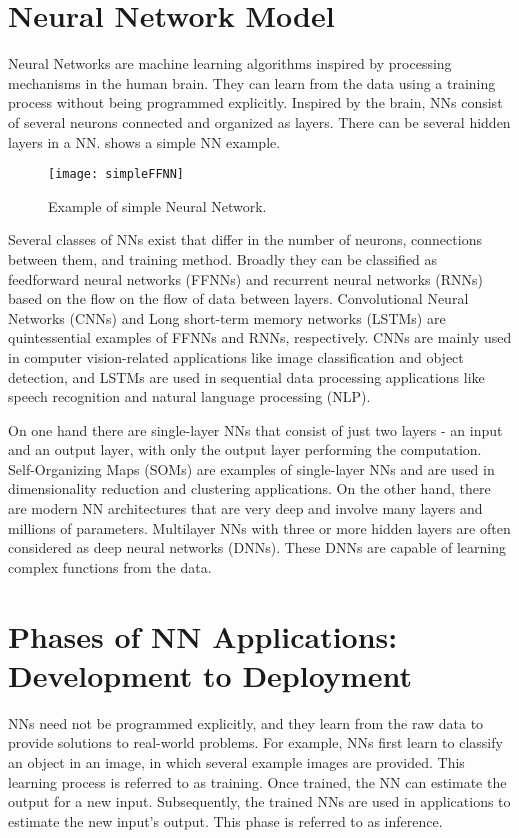 \section{Neural Network Model}
Neural Networks are machine learning algorithms inspired by processing mechanisms in the human brain. They can learn from the data using a training process without being programmed explicitly. Inspired by the brain, NNs consist of several neurons connected and organized as layers. There can be several hidden layers in a NN.  shows a simple NN example. 
\begin{figure}[!htb]
	\centering
	\captionsetup{font=sf}
	\texttt{[image: simpleFFNN]}
	\caption{Example of simple Neural Network.}
	\label{fig:simpleNN}
\end{figure}

Several classes of NNs exist that differ in the number of neurons, connections between them, and training method. Broadly they can be classified as feedforward neural networks (FFNNs) and recurrent neural networks (RNNs) based on the flow on the flow of data between layers. Convolutional Neural Networks (CNNs) and Long short-term memory networks (LSTMs) are quintessential examples of FFNNs and RNNs, respectively. CNNs are mainly used in computer vision-related applications like image classification and object detection, and LSTMs are used in sequential data processing applications like speech recognition and natural language processing (NLP). 

On one hand there are single-layer NNs that consist of just two layers - an input and an
output layer, with only the output layer performing the computation. Self-Organizing
Maps (SOMs) are examples of single-layer NNs and are used in dimensionality reduction
and clustering applications. On the other hand, there are modern NN architectures that
are very deep and involve many layers and millions of parameters. Multilayer NNs with three or
more hidden layers are often considered as deep neural networks (DNNs). These DNNs
are capable of learning complex functions from the data.

\section{Phases of NN Applications: Development to Deployment}
NNs need not be programmed explicitly, and they learn from the raw data to provide solutions to real-world problems. For example, NNs first learn to classify an object in an image, in which several example images are provided. This learning process is referred to as training. Once trained, the NN can estimate the output for a new input. Subsequently, the trained NNs are used in applications to estimate the new input's output. This phase is referred to as inference.

